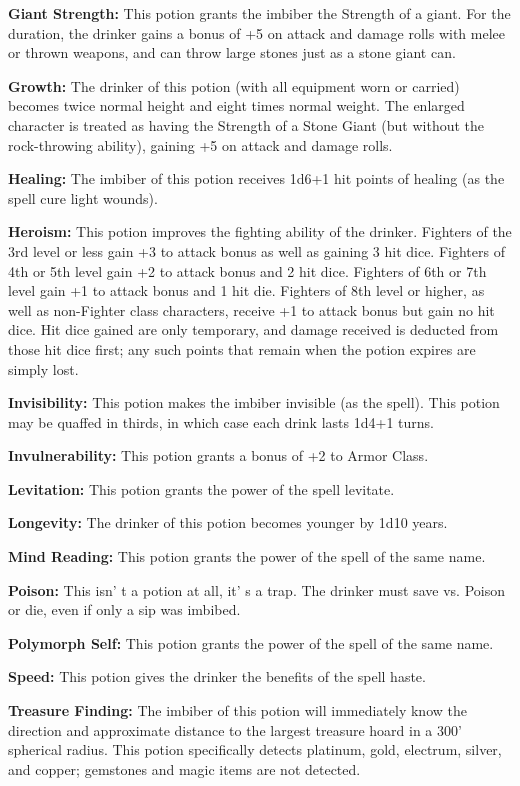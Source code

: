 \documentclass[a4paper,twoside,openany,10pt]{book}
\begin{document}
\begin{multicols}{2}
\textbf{Giant Strength: }This potion grants the imbiber the Strength of a giant. For the duration, the drinker gains a bonus of +5 on attack and damage rolls with melee or thrown weapons, and can throw large stones just as a stone giant can.

\textbf{Growth: }The drinker of this potion (with all equipment worn or carried) becomes twice normal height and eight times normal weight. The enlarged character is treated as having the Strength of a Stone Giant (but without the rock-throwing ability), gaining +5 on attack and damage rolls.

\textbf{Healing: }The imbiber of this potion receives 1d6+1 hit points of healing (as the spell cure light wounds).

\textbf{Heroism: } This potion improves the fighting ability of the drinker. Fighters of the 3rd level or less gain +3 to attack bonus as well as gaining 3 hit dice. Fighters of 4th or 5th level gain +2 to attack bonus and 2 hit dice. Fighters of 6th or 7th level gain +1 to attack bonus and 1 hit die. Fighters of 8th level or higher, as well as non-Fighter class characters, receive +1 to attack bonus but gain no hit dice. Hit dice gained are only temporary, and damage received is deducted from those hit dice first; any such points that remain when the potion expires are simply lost.

\textbf{Invisibility: }This potion makes the imbiber invisible (as the spell). This potion may be quaffed in thirds, in which case each drink lasts 1d4+1 turns.

\textbf{Invulnerability:} This potion grants a bonus of +2 to Armor Class.

\textbf{Levitation: }This potion grants the power of the spell levitate.

\textbf{Longevity: } The drinker of this potion becomes younger by 1d10
years.

\textbf{Mind Reading:} This potion grants the power of the spell of the same name.

\textbf{Poison: }This isn' t a potion at all, it' s a trap. The drinker must save vs. Poison or die, even if only a sip was imbibed.

\textbf{Polymorph Self:} This potion grants the power of the spell of the same name.

\textbf{Speed: } This potion gives the drinker the benefits of the spell
haste.

\textbf{Treasure Finding: }The imbiber of this potion will immediately know the direction and approximate distance to the largest treasure hoard in a 300' spherical radius. This potion specifically detects platinum, gold, electrum, silver, and copper; gemstones and magic items are not detected.


\end{multicols}
\end{document}
